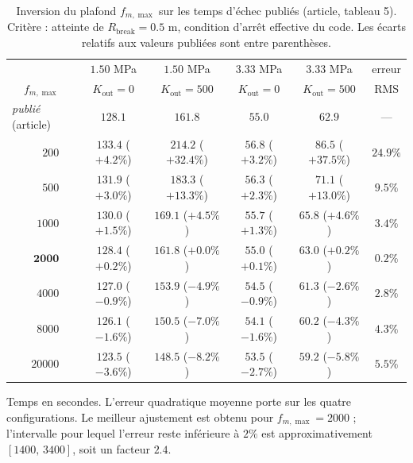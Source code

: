 \documentclass[11pt,a4paper]{report}
\newcommand{\kout}{K_{\mathrm{out}}}
\begin{document}
\begin{table}[H]
\centering
\caption{Inversion du plafond \(f_{m,\max}\) sur les temps d'échec publiés (article, tableau 5). Critère :
atteinte de \(R_{\mathrm{break}} = 0.5\) m, condition d'arrêt effective du code. Les écarts relatifs aux
valeurs publiées sont entre parenthèses.}
\label{tab:fm-inversion}
\small
\begin{tabular}{rcccccc}
\toprule
& & \(1.50\) MPa & \(1.50\) MPa & \(3.33\) MPa & \(3.33\) MPa & erreur \\
\(f_{m,\max}\) & & \(\kout = 0\) & \(\kout = 500\) & \(\kout = 0\) & \(\kout = 500\) & RMS \\
\midrule
\multicolumn{2}{l}{\emph{publié} (article)} & \(128.1\) & \(161.8\) & \(55.0\) & \(62.9\) & --- \\
\midrule
\(200\)   & & \(133.4\) \scriptsize(\(+4.2\%\)) & \(214.2\) \scriptsize(\(+32.4\%\)) & \(56.8\) \scriptsize(\(+3.2\%\)) & \(86.5\) \scriptsize(\(+37.5\%\)) & \(24.9\%\) \\
\(500\)   & & \(131.9\) \scriptsize(\(+3.0\%\)) & \(183.3\) \scriptsize(\(+13.3\%\)) & \(56.3\) \scriptsize(\(+2.3\%\)) & \(71.1\) \scriptsize(\(+13.0\%\)) & \(9.5\%\) \\
\(1000\)  & & \(130.0\) \scriptsize(\(+1.5\%\)) & \(169.1\) \scriptsize(\(+4.5\%\)) & \(55.7\) \scriptsize(\(+1.3\%\)) & \(65.8\) \scriptsize(\(+4.6\%\)) & \(3.4\%\) \\
\(\mathbf{2000}\) & & \(\mathbf{128.4}\) \scriptsize(\(+0.2\%\)) & \(\mathbf{161.8}\) \scriptsize(\(+0.0\%\)) & \(\mathbf{55.0}\) \scriptsize(\(+0.1\%\)) & \(\mathbf{63.0}\) \scriptsize(\(+0.2\%\)) & \(\mathbf{0.2\%}\) \\
\(4000\)  & & \(127.0\) \scriptsize(\(-0.9\%\)) & \(153.9\) \scriptsize(\(-4.9\%\)) & \(54.5\) \scriptsize(\(-0.9\%\)) & \(61.3\) \scriptsize(\(-2.6\%\)) & \(2.8\%\) \\
\(8000\)  & & \(126.1\) \scriptsize(\(-1.6\%\)) & \(150.5\) \scriptsize(\(-7.0\%\)) & \(54.1\) \scriptsize(\(-1.6\%\)) & \(60.2\) \scriptsize(\(-4.3\%\)) & \(4.3\%\) \\
\(20000\) & & \(123.5\) \scriptsize(\(-3.6\%\)) & \(148.5\) \scriptsize(\(-8.2\%\)) & \(53.5\) \scriptsize(\(-2.7\%\)) & \(59.2\) \scriptsize(\(-5.8\%\)) & \(5.5\%\) \\
\bottomrule
\end{tabular}
\begin{tablenotes}
\small
\item Temps en secondes. L'erreur quadratique moyenne porte sur les quatre configurations. Le meilleur
ajustement est obtenu pour \(f_{m,\max} = 2000\) ; l'intervalle pour lequel l'erreur reste inférieure à
\(2\%\) est approximativement \([1400,\,3400]\), soit un facteur \(2.4\).
\end{tablenotes}
\end{table}
\end{document}
